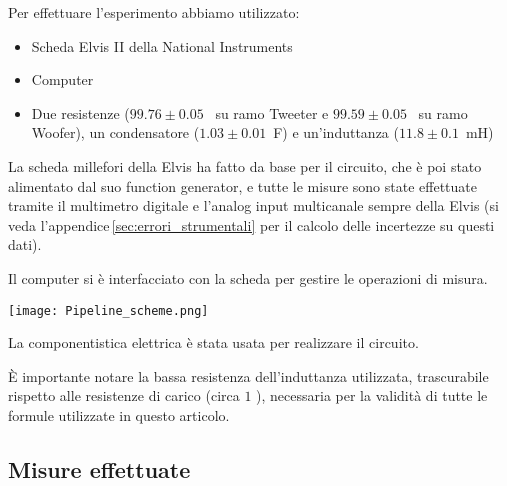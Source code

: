\documentclass[../Relazione_circuiti]{subfiles}
\begin{document}
\begin{minipage}{.49\textwidth}
  \setlength{\parindent}{20pt}
  Per effettuare l'esperimento abbiamo utilizzato:
  \begin{itemize}
    \item Scheda Elvis II della National Instruments
    \item Computer
    \item Due resistenze ($99.76 \pm 0.05$~\textOmega \hspace{1pt} su ramo Tweeter e $99.59 \pm 0.05$~\textOmega
    \hspace{1pt} su ramo Woofer), un condensatore ($1.03 \pm 0.01 $~\textmu F) e un'induttanza ($11.8 \pm 0.1$~mH)
  \end{itemize}

  La scheda millefori della Elvis ha fatto da base per il circuito, che è poi stato alimentato dal suo function
  generator, e tutte le misure sono state effettuate tramite il multimetro digitale e l'analog input multicanale sempre
  della Elvis (si veda l'appendice\,\ref{sec:errori_strumentali} per il calcolo delle incertezze su questi dati).

  Il computer si è interfacciato con la scheda per gestire le operazioni di misura.
\end{minipage}
\hfill
\begin{minipage}{0.50\textwidth}
  \centering
  \texttt{[image: Pipeline\_scheme.png]}
\end{minipage}\vspace{1mm}
\indent La componentistica elettrica è stata usata per realizzare il circuito.

È importante notare la bassa resistenza dell'induttanza utilizzata, trascurabile rispetto alle resistenze di carico
(circa $1$ \textOmega), necessaria per la validità di tutte le formule utilizzate in questo articolo.

\subsection{Misure effettuate}\label{subsec:misure-effettuate}
\end{document}
